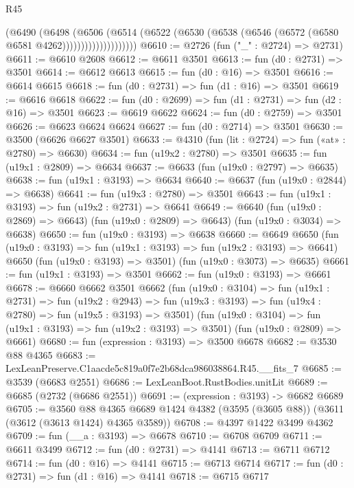 \begin{lexlean}{R45}
\begin{coremodule}
                        (@6490
                          (@6498
                            (@6506
                              (@6514
                                (@6522
                                  (@6530 (@6538 (@6546 (@6572 (@6580 @6581 @4262))))))))))))))))))))
@6610 := @2726 (fun ("_" : @2724) => @2731)
@6611 := @6610 @2608
@6612 := @6611 @3501
@6613 := fun (d0 : @2731) => @3501
@6614 := @6612 @6613
@6615 := fun (d0 : @16) => @3501
@6616 := @6614 @6615
@6618 := fun (d0 : @2731) => fun (d1 : @16) => @3501
@6619 := @6616 @6618
@6622 := fun (d0 : @2699) => fun (d1 : @2731) => fun (d2 : @16) => @3501
@6623 := @6619 @6622
@6624 := fun (d0 : @2759) => @3501
@6626 := @6623 @6624 @6624
@6627 := fun (d0 : @2714) => @3501
@6630 := @3500 (@6626 @6627 @3501)
@6633 := @4310 (fun (lit : @2724) => fun («at» : @2780) => @6630)
@6634 := fun (u19x2 : @2780) => @3501
@6635 := fun (u19x1 : @2809) => @6634
@6637 := @6633 (fun (u19x0 : @2797) => @6635)
@6638 := fun (u19x1 : @3193) => @6634
@6640 := @6637 (fun (u19x0 : @2844) => @6638)
@6641 := fun (u19x3 : @2780) => @3501
@6643 := fun (u19x1 : @3193) => fun (u19x2 : @2731) => @6641
@6649 := @6640
    (fun (u19x0 : @2869) => @6643)
    (fun (u19x0 : @2809) => @6643)
    (fun (u19x0 : @3034) => @6638)
@6650 := fun (u19x0 : @3193) => @6638
@6660 := @6649
    @6650
    (fun (u19x0 : @3193) => fun (u19x1 : @3193) => fun (u19x2 : @3193) => @6641)
    @6650
    (fun (u19x0 : @3193) => @3501)
    (fun (u19x0 : @3073) => @6635)
@6661 := fun (u19x1 : @3193) => @3501
@6662 := fun (u19x0 : @3193) => @6661
@6678 := @6660
    @6662
    @3501
    @6662
    (fun (u19x0 : @3104) =>
    fun (u19x1 : @2731) =>
    fun (u19x2 : @2943) =>
    fun (u19x3 : @3193) => fun (u19x4 : @2780) => fun (u19x5 : @3193) => @3501)
    (fun (u19x0 : @3104) => fun (u19x1 : @3193) => fun (u19x2 : @3193) => @3501)
    (fun (u19x0 : @2809) => @6661)
@6680 := fun (expression : @3193) => @3500 @6678
@6682 := @3530 @88 @4365
@6683 := LexLeanPreserve.C1aacde5c819a0f7e2b68dca986038864.R45.__fits_7
@6685 := @3539 (@6683 @2551)
@6686 := LexLeanBoot.RustBodies.unitLit
@6689 := @6685 (@2732 (@6686 @2551))
@6691 := (expression : @3193) -> @6682 @6689
@6705 := @3560
    @88
    @4365
    @6689
    @1424
    @4382
    (@3595 (@3605 @88))
    (@3611 (@3612 (@3613 @1424) @4365 @3589))
@6708 := @4397 @1422 @3499 @4362
@6709 := fun (__a : @3193) => @6678
@6710 := @6708 @6709
@6711 := @6611 @3499
@6712 := fun (d0 : @2731) => @4141
@6713 := @6711 @6712
@6714 := fun (d0 : @16) => @4141
@6715 := @6713 @6714
@6717 := fun (d0 : @2731) => fun (d1 : @16) => @4141
@6718 := @6715 @6717

\end{coremodule}
\end{lexlean}
